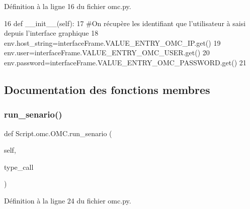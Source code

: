 Définition à la ligne 16 du fichier omc.\+py.


\begin{DoxyCode}
16     \textcolor{keyword}{def }\_\_init\_\_(self):
17         \textcolor{comment}{#On récupère les identifiant que l'utilisateur à saisi depuis l'interface graphique
}
18         env.host\_string=interfaceFrame.VALUE\_ENTRY\_OMC\_IP.get()
19         env.user=interfaceFrame.VALUE\_ENTRY\_OMC\_USER.get()
20         env.password=interfaceFrame.VALUE\_ENTRY\_OMC\_PASSWORD.get()
21 
\end{DoxyCode}


\subsection{Documentation des fonctions membres}
\mbox{\label{classScript_1_1omc_1_1OMC_a8446de2325ea79f5574f2822da38b5cf}} 
\subsubsection{\texorpdfstring{run\+\_\+senario()}{run\_senario()}}
{\footnotesize\ttfamily def Script.\+omc.\+O\+M\+C.\+run\+\_\+senario (\begin{DoxyParamCaption}\item[{}]{self,  }\item[{}]{type\+\_\+call }\end{DoxyParamCaption})}



Définition à la ligne 24 du fichier omc.\+py.


